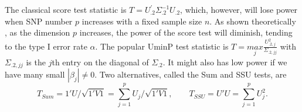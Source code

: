 \documentclass[12pt]{article}
\begin{document}
%

The classical score test statistic is $T=U_{.2}^{'}\Sigma_{.2}^{-1}U_{.2}$, which, however, will lose power when SNP number $p$ increases with a fixed sample size $n$. As shown theoretically \cite{Fan1996}, as the dimension $p$ increases, the power of the score test will diminish, tending to the type I error rate $\alpha$. The popular UminP test statistic is $T=\underset{j}{max}\frac{U_{.2,j}^{2}}{\Sigma_{.2,jj}}$ with $\Sigma_{.2,jj}$ is the $j$th entry on the diagonal of $\Sigma_{.2}$. It might also has low power if we have many small $|\beta_j| \neq 0$. Two alternatives, called the Sum and SSU tests, are
$$
T_{Sum} = 1' U / \sqrt{1' V 1} = \sum_{j=1}^p U_j / \sqrt{1' V 1}, \qquad T_{SSU} = U'U = \sum_{j=1}^p U_j^2.
$$
\end{document}

